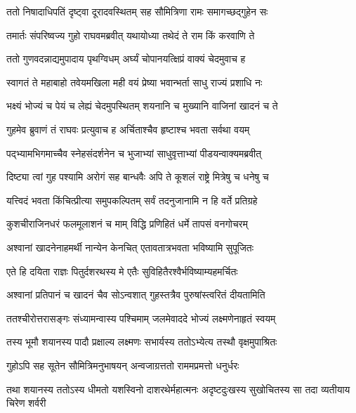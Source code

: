 \twolineshloka
{ततो निषादाधिपतिं दृष्ट्वा दूरादवस्थितम्}
{सह सौमित्रिणा रामः समागच्छद्गुहेन सः} %

\twolineshloka
{तमार्तः संपरिष्वज्य गुहो राघवमब्रवीत्}
{यथायोध्या तथेदं ते राम किं करवाणि ते} %

\twolineshloka
{ततो गुणवदन्नाद्यमुपादाय पृथग्विधम्}
{अर्घ्यं चोपानयत्क्षिप्रं वाक्यं चेदमुवाच ह} %

\twolineshloka
{स्वागतं ते महाबाहो तवेयमखिला मही}
{वयं प्रेष्या भवान्भर्ता साधु राज्यं प्रशाधि नः} %

\twolineshloka
{भक्ष्यं भोज्यं च पेयं च लेह्यं चेदमुपस्थितम्}
{शयनानि च मुख्यानि वाजिनां खादनं च ते} %

\twolineshloka
{गुहमेव ब्रुवाणं तं राघवः प्रत्युवाच ह}
{अर्चिताश्चैव हृष्टाश्च भवता सर्वथा वयम्} %

\twolineshloka
{पद्भ्यामभिगमाच्चैव स्नेहसंदर्शनेन च}
{भुजाभ्यां साधुवृत्ताभ्यां पीडयन्वाक्यमब्रवीत्} %

\twolineshloka
{दिष्ट्या त्वां गुह पश्यामि अरोगं सह बान्धवैः}
{अपि ते कूशलं राष्ट्रे मित्रेषु च धनेषु च} %

\twolineshloka
{यत्त्विदं भवता किंचित्प्रीत्या समुपकल्पितम्}
{सर्वं तदनुजानामि न हि वर्ते प्रतिग्रहे} %

\twolineshloka
{कुशचीराजिनधरं फलमूलाशनं च माम्}
{विद्धि प्रणिहितं धर्मे तापसं वनगोचरम्} %

\twolineshloka
{अश्वानां खादनेनाहमर्थी नान्येन केनचित्}
{एतावतात्रभवता भविष्यामि सुपूजितः} %

\twolineshloka
{एते हि दयिता राज्ञः पितुर्दशरथस्य मे}
{एतैः सुविहितैरश्वैर्भविष्याम्यहमर्चितः} %

\twolineshloka
{अश्वानां प्रतिपानं च खादनं चैव सोऽन्वशात्}
{गुहस्तत्रैव पुरुषांस्त्वरितं दीयतामिति} %

\twolineshloka
{ततश्चीरोत्तरासङ्गः संध्यामन्वास्य पश्चिमाम्}
{जलमेवाददे भोज्यं लक्ष्मणेनाहृतं स्वयम्} %

\twolineshloka
{तस्य भूमौ शयानस्य पादौ प्रक्षाल्य लक्ष्मणः}
{सभार्यस्य ततोऽभ्येत्य तस्थौ वृक्षमुपाश्रितः} %

\twolineshloka
{गुहोऽपि सह सूतेन सौमित्रिमनुभाषयन्}
{अन्वजाग्रत्ततो राममप्रमत्तो धनुर्धरः} %

\fourlineindentedshloka
{तथा शयानस्य ततोऽस्य धीमतो}
{ यशस्विनो दाशरथेर्महात्मनः}
{अदृष्टदुःखस्य सुखोचितस्य सा}
{ तदा व्यतीयाय चिरेण शर्वरी} %


